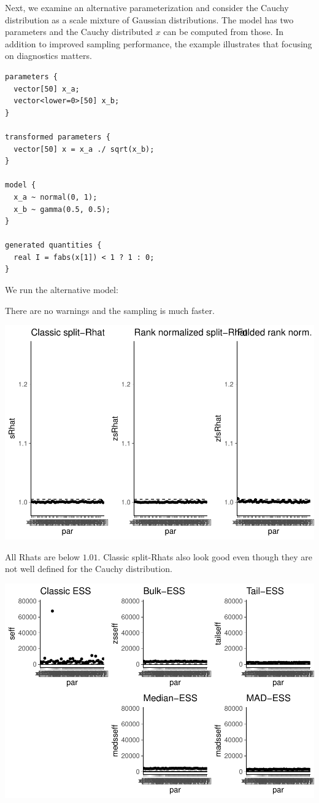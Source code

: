 \documentclass[american,]{article}
\begin{document}
Next, we examine an alternative parameterization and consider the Cauchy
distribution as a scale mixture of Gaussian distributions. The model has
two parameters and the Cauchy distributed \(x\) can be computed from
those. In addition to improved sampling performance, the example
illustrates that focusing on diagnostics matters.

\begin{verbatim}
parameters {
  vector[50] x_a;
  vector<lower=0>[50] x_b;
}

transformed parameters {
  vector[50] x = x_a ./ sqrt(x_b);
}

model {
  x_a ~ normal(0, 1);
  x_b ~ gamma(0.5, 0.5);
}

generated quantities {
  real I = fabs(x[1]) < 1 ? 1 : 0;
}
\end{verbatim}

We run the alternative model:

There are no warnings and the sampling is much faster.

\includegraphics{graphics/rhat-fit-alt1-1.pdf}

All Rhats are below \(1.01\). Classic split-Rhats also look good even
though they are not well defined for the Cauchy distribution.

\includegraphics{graphics/ess-fit-alt1-1.pdf}
\end{document}
